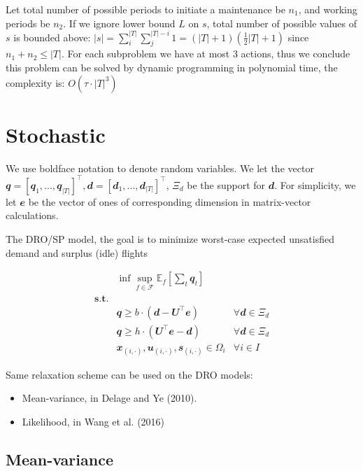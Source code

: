 \documentclass[
  a4paper,
,tablecaptionabove
]{scrartcl}
\numberwithin{equation}{section}
\providecommand{\tightlist}{%
  \setlength{\itemsep}{0pt}\setlength{\parskip}{0pt}}
\begin{document}
Let total number of possible periods to initiate a maintenance be
\(n_1\), and working periods be \(n_2\). If we ignore lower bound \(L\)
on \(s\), total number of possible values of \(s\) is bounded above:
\(|s| = \sum_i^{|T|}\sum_j^{|T| - i} 1=(|T| + 1)(\frac{1}{2}|T| + 1)\)
since \(n_1 + n_2 \le |T|\). For each subproblem we have at most 3
actions, thus we conclude this problem can be solved by dynamic
programming in polynomial time, the complexity is:
\(O\left(\tau\cdot|T|^3 \right)\)

\hypertarget{stochastic}{%
\section{Stochastic}\label{stochastic}}

We use boldface notation to denote random variables. We let the vector
\(\mathbfit q = [\mathbfit q_1, ..., \mathbfit q_{|T|}]^\top, \mathbfit d = [\mathbfit d_1,...,\mathbfit d_{|T|}]^\top\),
\(\Xi_d\) be the support for \(\mathbfit{d}\). For simplicity, we let
\(\mathbfit e\) be the vector of ones of corresponding dimension in
matrix-vector calculations.

The DRO/SP model, the goal is to minimize worst-case expected
unsatisfied demand and surplus (idle) flights

\[\begin{aligned}
  & \inf \sup_{f\in \mathscr F}\mathbb E_f \left[ \sum_t \mathbfit q_t  \right] \\
  \mathbf{s.t.}  & \\
  & \mathbfit q \ge b\cdot \left (\mathbfit d - \mathbfit U^\top \mathbfit{e} \right) & \forall \mathbfit d \in \Xi_d\\
  & \mathbfit q \ge h\cdot \left ( \mathbfit U^\top \mathbfit{e}  - \mathbfit d \right ) & \forall \mathbfit d \in \Xi_d \\
  & \mathbfit x_{(i,\cdot)}, \mathbfit u_{(i,\cdot)}, \mathbfit s_{(i,\cdot)} \in \Omega_i & \forall i\in I
\end{aligned}\]

Same relaxation scheme can be used on the DRO models:

\begin{itemize}
\tightlist
\item
  Mean-variance, in Delage and Ye (2010).
\item
  Likelihood, in Wang et al. (2016)
\end{itemize}

\hypertarget{mean-variance}{%
\subsection{Mean-variance}\label{mean-variance}}
\end{document}
